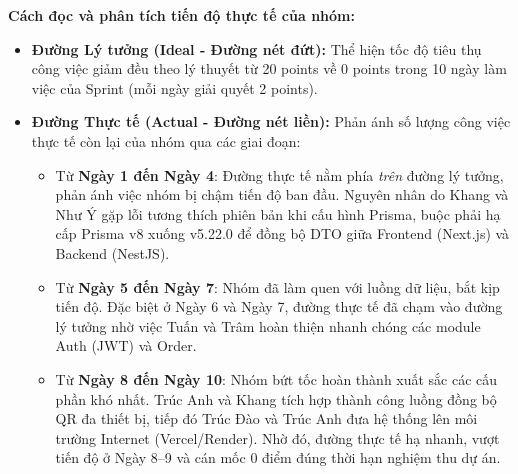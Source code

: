 \textbf{Cách đọc và phân tích tiến độ thực tế của nhóm:}
\begin{itemize}
    \item \textbf{Đường Lý tưởng (Ideal - Đường nét đứt):} Thể hiện tốc độ tiêu thụ công việc giảm đều theo lý thuyết từ 20 points về 0 points trong 10 ngày làm việc của Sprint (mỗi ngày giải quyết 2 points).
    \item \textbf{Đường Thực tế (Actual - Đường nét liền):} Phản ánh số lượng công việc thực tế còn lại của nhóm qua các giai đoạn:
    \begin{itemize}
        \item Từ \textbf{Ngày 1 đến Ngày 4}: Đường thực tế nằm phía \textit{trên} đường lý tưởng, phản ánh việc nhóm bị chậm tiến độ ban đầu. Nguyên nhân do Khang và Như Ý gặp lỗi tương thích phiên bản khi cấu hình Prisma, buộc phải hạ cấp Prisma v8 xuống v5.22.0 để đồng bộ DTO giữa Frontend (Next.js) và Backend (NestJS).
        \item Từ \textbf{Ngày 5 đến Ngày 7}: Nhóm đã làm quen với luồng dữ liệu, bắt kịp tiến độ. Đặc biệt ở Ngày 6 và Ngày 7, đường thực tế đã chạm vào đường lý tưởng nhờ việc Tuấn và Trâm hoàn thiện nhanh chóng các module Auth (JWT) và Order.
        \item Từ \textbf{Ngày 8 đến Ngày 10}: Nhóm bứt tốc hoàn thành xuất sắc các cấu phần khó nhất. Trúc Anh và Khang tích hợp thành công luồng đồng bộ QR đa thiết bị, tiếp đó Trúc Đào và Trúc Anh đưa hệ thống lên môi trường Internet (Vercel/Render). Nhờ đó, đường thực tế hạ nhanh, vượt tiến độ ở Ngày 8--9 và cán mốc 0 điểm đúng thời hạn nghiệm thu dự án.
    \end{itemize}
\end{itemize}